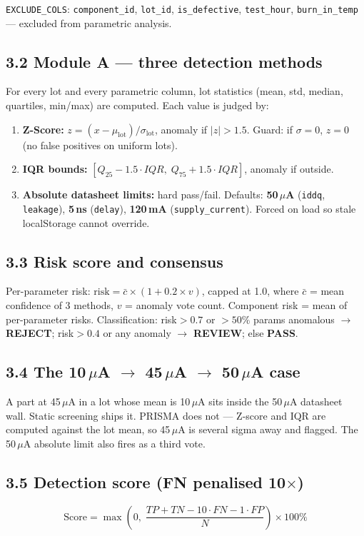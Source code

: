 \documentclass[11pt,a4paper]{article}
\newcommand{\code}[1]{\texttt{\small #1}}
\newcommand{\keys}[1]{\textbf{\sffamily#1}}
\begin{document}
\noindent \code{EXCLUDE\_COLS}: \code{component\_id}, \code{lot\_id}, \code{is\_defective},
\code{test\_hour}, \code{burn\_in\_temp} --- excluded from parametric analysis.

\subsection*{3.2 Module A --- three detection methods}
For every lot and every parametric column, lot statistics (mean, std, median, quartiles, min/max)
are computed. Each value is judged by:
\begin{enumerate}[leftmargin=1.5em]
  \item \textbf{Z-Score:} $z=(x-\mu_{\text{lot}})/\sigma_{\text{lot}}$, anomaly if $|z|>1.5$.
        Guard: if $\sigma=0$, $z=0$ (no false positives on uniform lots).
  \item \textbf{IQR bounds:} $[Q_{25}-1.5\cdot IQR,\;Q_{75}+1.5\cdot IQR]$, anomaly if outside.
  \item \textbf{Absolute datasheet limits:} hard pass/fail. Defaults: \textbf{50\,$\mu$A}
        (\code{iddq}, \code{leakage}), \textbf{5\,ns} (\code{delay}), \textbf{120\,mA}
        (\code{supply\_current}). Forced on load so stale localStorage cannot override.
\end{enumerate}

\subsection*{3.3 Risk score and consensus}
Per-parameter risk: $\text{risk} = \bar{c}\times(1 + 0.2\times v)$, capped at 1.0, where $\bar{c}$
= mean confidence of 3 methods, $v$ = anomaly vote count. Component risk = mean of per-parameter
risks. Classification: risk$>0.7$ or $>50\%$ params anomalous $\rightarrow$ \keys{REJECT};
risk$>0.4$ or any anomaly $\rightarrow$ \keys{REVIEW}; else \keys{PASS}.

\subsection*{3.4 The 10\,$\mu$A $\rightarrow$ 45\,$\mu$A $\rightarrow$ 50\,$\mu$A case}
A part at 45\,$\mu$A in a lot whose mean is 10\,$\mu$A sits inside the 50\,$\mu$A datasheet wall.
Static screening ships it. PRISMA does not --- Z-score and IQR are computed against the lot mean,
so 45\,$\mu$A is several sigma away and flagged. The 50\,$\mu$A absolute limit also fires as a
third vote.

\subsection*{3.5 Detection score (FN penalised 10$\times$)}
\begin{equation*}
\text{Score}=\max\left(0,\;\frac{TP+TN-10\cdot FN-1\cdot FP}{N}\right)\times100\%
\end{equation*}
\end{document}
